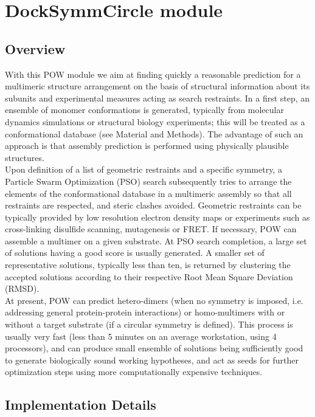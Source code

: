 \documentclass[a4paper, 12pt]{article}
\begin{document}
\section{DockSymmCircle module}

\subsection{Overview}

With this POW module we aim at finding quickly a reasonable prediction for a multimeric structure arrangement on the basis of structural information about its subunits and experimental measures acting as search restraints. In a first step, an ensemble of monomer conformations is generated, typically from molecular dynamics simulations or structural biology experiments; this will be treated as a conformational database (see Material and Methods). The advantage of such an approach is that assembly prediction is performed using physically plausible structures.\\
Upon definition of a list of geometric restraints and a specific symmetry, a Particle Swarm Optimization (PSO) search subsequently tries to arrange the elements of the conformational database in a multimeric assembly so that all restraints are respected, and steric clashes avoided. Geometric restraints can be typically provided by low resolution electron density maps or experiments such as cross-linking disulfide scanning, mutagenesis or FRET. If necessary, POW can assemble a multimer on a given substrate. At PSO search completion, a large set of solutions having a good score is usually generated. A smaller set of representative solutions, typically less than ten, is returned by clustering the accepted solutions according to their respective Root Mean Square Deviation (RMSD).\\

At present, POW can predict hetero-dimers (when no symmetry is imposed, i.e. addressing general protein-protein interactions) or homo-multimers with or without a target substrate (if a circular symmetry is defined). This process is usually very fast (less than 5 minutes on an average workstation, using 4 processors), and can produce small ensemble of solutions being sufficiently good to generate biologically sound working hypotheses, and act as seeds for further optimization steps using more computationally expensive techniques.

\subsection{Implementation Details}
\end{document}
